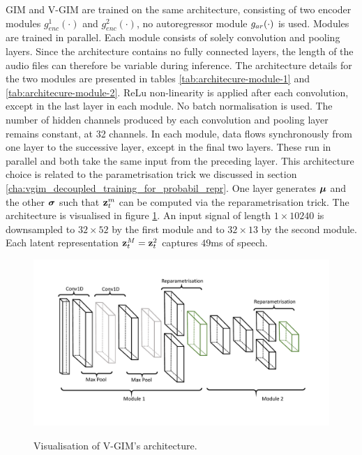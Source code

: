 		GIM and V-GIM are trained on the same architecture, consisting of two encoder modules $g_{enc}^1(\cdot)$ and $g_{enc}^2(\cdot)$, no autoregressor module $g_{ar}(\cdot)$ is used. Modules are trained in parallel. Each module consists of solely convolution and pooling layers. Since the architecture contains no fully connected layers, the length of the audio files can therefore be variable during inference. The architecture details for the two modules are presented in tables \ref{tab:architecure-module-1} and \ref{tab:architecure-module-2}. ReLu non-linearity is applied after each convolution, except in the last layer in each module. No batch normalisation is used. The number of hidden channels produced by each convolution and pooling layer remains constant, at 32 channels. In each module, data flows synchronously from one layer to the successive layer, except in the final two layers. These run in parallel and both take the same input from the preceding layer. This architecture choice is related to the parametrisation trick we discussed in section \ref{cha:vgim_decoupled_training_for_probabil_repr}. One layer generates $\bm{\mu}$ and the other $\bm{\sigma}$ such that $\mathbf{z}_t^{m}$ can be computed via the reparametrisation trick. The architecture is visualised in figure \ref{fig:architecture}. 
		An input signal of length $1 \times 10240$ is downsampled to $32 \times 52$ by the first module and to $32 \times 13$ by the second module. Each latent representation $\mathbf{z}_t^M = \mathbf{z}_t^2$ captures $49$ms of speech.

	
		

		\begin{figure}
			\centering
			\hspace*{1.5cm}
			\begin{annotatedFigure}
				{\includegraphics[width=0.8\linewidth, trim={0 2.8cm 0 2cm}, clip]{"graphs/vgim architecture"} }
				
				
				
				
			\end{annotatedFigure}
			\caption{Visualisation of V-GIM's architecture.}
			\label{fig:architecture}
		\end{figure}
		
